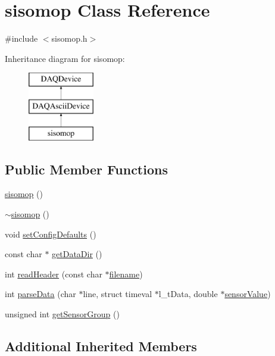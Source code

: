 \hypertarget{classsisomop}{\section{sisomop Class Reference}
\label{classsisomop}
}


{\ttfamily \#include $<$sisomop.\-h$>$}

Inheritance diagram for sisomop\-:\begin{figure}[H]
\begin{center}
\leavevmode
\includegraphics[height=3.000000cm]{classsisomop}
\end{center}
\end{figure}
\subsection*{Public Member Functions}
\begin{DoxyCompactItemize}
\item 
\hyperlink{classsisomop_a243e702fdb0d3610bc7c019840551d1f}{sisomop} ()
\item 
\hyperlink{classsisomop_a9fa5295780f44baa15987437b8b0e742}{$\sim$sisomop} ()
\item 
void \hyperlink{classsisomop_a388047e129e1c7082a8d9e99e2e8ec99}{set\-Config\-Defaults} ()
\item 
const char $\ast$ \hyperlink{classsisomop_a3f242e161d194348f13d8a4b399e23a3}{get\-Data\-Dir} ()
\item 
int \hyperlink{classsisomop_a658a1ebe29f6405d2aabb7b3ce335fdd}{read\-Header} (const char $\ast$\hyperlink{classDAQDevice_a7f9cda7cf5b41f6b134c313477e9644b}{filename})
\item 
int \hyperlink{classsisomop_a8c2afe6fe5aac3e8b8e860f3589407c1}{parse\-Data} (char $\ast$line, struct timeval $\ast$l\-\_\-t\-Data, double $\ast$\hyperlink{classDAQDevice_ad148188c57598fdf4fd4c1c333aeb0d8}{sensor\-Value})
\item 
unsigned int \hyperlink{classsisomop_ac80a0cb371d6419d2dcd6bdc3b93cc6d}{get\-Sensor\-Group} ()
\end{DoxyCompactItemize}
\subsection*{Additional Inherited Members}


